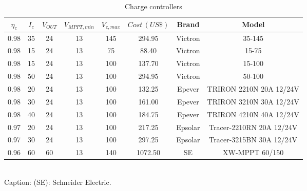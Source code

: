 \begin{table}
\caption{Charge controllers}\label{tab:charg}
\begin{scriptsize}
\begin{tabular}{|c|c|c|c|c|c|c|c|}
\hline
\hline
$\eta_{c}$ & $I_{c}$  & $V_{OUT}$ & $V_{MPPT,min}$  & $V_{c,max}$ & $Cost \, (US\$)$ & Brand & Model\\
\hline
\hline
0.98 & 35 & 24 & 13 & 145 & 294.95 & Victron & 35-145 \\
\hline
0.98 & 15 & 24 & 13 & 75 & 88.40 & Victron & 15-75 \\
\hline
0.98 & 15 & 24 & 13 & 100 & 137.70 & Victron & 15-100 \\
\hline
0.98 & 50 & 24 & 13 & 100 & 294.95 & Victron & 50-100 \\
\hline
0.98 & 20 & 24 & 13 & 100 & 132.25 & Epever & TRIRON 2210N 20A 12/24V \\
\hline
0.98 & 30 & 24 & 13 & 100 & 161.00 & Epever & TRIRON 3210N 30A 12/24V \\
\hline
0.98 & 40 & 24 & 13 & 100 & 184.75 & Epever & TRIRON 4210N 40A 12/24V \\
\hline
0.97 & 20 & 24 & 13 & 100 & 217.25 & Epsolar & Tracer-2210RN 20A 12/24V \\
\hline
0.97 & 30 & 24 & 13 & 100 & 297.25 & Epsolar & Tracer-3215BN 30A 12/24V \\
\hline
0.96 & 60 & 60 & 13 & 140 & 1072.50 & SE & XW-MPPT 60/150 \\
\hline
\hline
\end{tabular}
\\Caption: (SE): Schneider Electric.
\end{scriptsize}
\end{table}


